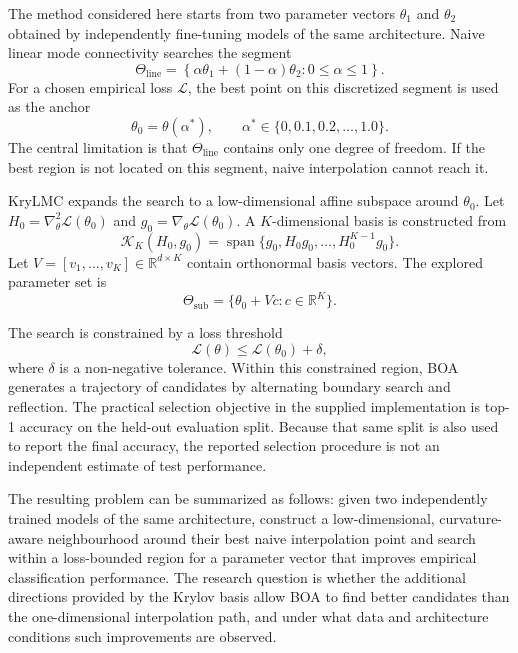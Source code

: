 \documentclass[11pt,a4paper]{article}
\newcommand{\R}{\mathbb{R}}
\newcommand{\Krylov}{\mathcal{K}}
\begin{document}
The method considered here starts from two parameter vectors $\theta_1$ and $\theta_2$ obtained by independently fine-tuning models of the same architecture. Naive linear mode connectivity searches the segment
\begin{equation}
 \Theta_{\mathrm{line}}=\left\{\alpha\theta_1+(1-\alpha)\theta_2:0\leq\alpha\leq1\right\}.
 \label{eq:line_set}
\end{equation}
For a chosen empirical loss $\mathcal{L}$, the best point on this discretized segment is used as the anchor
\begin{equation}
 \theta_0=\theta(\alpha^*),\qquad
 \alpha^*\in\{0,0.1,0.2,\ldots,1.0\}.
 \label{eq:anchor}
\end{equation}
The central limitation is that $\Theta_{\mathrm{line}}$ contains only one degree of freedom. If the best region is not located on this segment, naive interpolation cannot reach it.

KryLMC expands the search to a low-dimensional affine subspace around $\theta_0$. Let $H_0=\nabla^2_\theta\mathcal{L}(\theta_0)$ and $g_0=\nabla_\theta\mathcal{L}(\theta_0)$. A $K$-dimensional basis is constructed from
\begin{equation}
 \Krylov_K(H_0,g_0)=\operatorname{span}\{g_0,H_0g_0,\ldots,H_0^{K-1}g_0\}.
 \label{eq:problem_krylov}
\end{equation}
Let $V=[v_1,\ldots,v_K]\in\R^{d\times K}$ contain orthonormal basis vectors. The explored parameter set is
\begin{equation}
 \Theta_{\mathrm{sub}}=\{\theta_0+Vc:c\in\R^K\}.
 \label{eq:affine_subspace}
\end{equation}

The search is constrained by a loss threshold
\begin{equation}
 \mathcal{L}(\theta)\leq\mathcal{L}(\theta_0)+\delta,
 \label{eq:loss_constraint}
\end{equation}
where $\delta$ is a non-negative tolerance. Within this constrained region, BOA generates a trajectory of candidates by alternating boundary search and reflection. The practical selection objective in the supplied implementation is top-1 accuracy on the held-out evaluation split. Because that same split is also used to report the final accuracy, the reported selection procedure is not an independent estimate of test performance.

The resulting problem can be summarized as follows: given two independently trained models of the same architecture, construct a low-dimensional, curvature-aware neighbourhood around their best naive interpolation point and search within a loss-bounded region for a parameter vector that improves empirical classification performance. The research question is whether the additional directions provided by the Krylov basis allow BOA to find better candidates than the one-dimensional interpolation path, and under what data and architecture conditions such improvements are observed.
\end{document}
